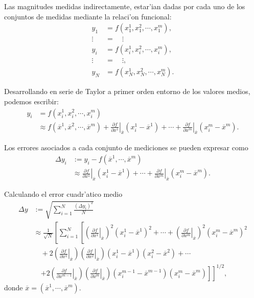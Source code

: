 \documentclass[a4paper]{report}
\begin{document}
Las magnitudes medidas indirectamente, estar'ian dadas por cada uno de los conjuntos de medidas mediante la relaci'on funcional:
\begin{align}
y_1 &= f(x^1_1,x^2_1,\cdots, x^m_1), \\
\vdots &= \quad\vdots  \\
y_i &= f(x^1_i,x^2_i,\cdots, x^m_i),\\
\vdots &= \quad \vdots,  \\
y_N &= f(x^1_N,x^2_N,\cdots, x^m_N).
\end{align}

Desarrollando en serie de Taylor a primer orden entorno de los valores medios, podemos escribir:
\begin{align}
y_i & = f(x^1_i,x^2_i,\cdots, x^m_i)\\
&\approx  f(\overline{x}^1,\overline{x}^2,\cdots, \overline{x}^m)+ \left.\frac{\partial f}{\partial x^1}\right|_{\overline{x}}(x^1_i-\overline{x}^1) + \cdots + \left.\frac{\partial f}{\partial x^m}\right|_{\overline{x}}(x^m_i-\overline{x}^m).
\end{align}

Los errores asociados a cada conjunto de mediciones se pueden expresar como
\begin{align}
\Delta y_i &:= y_i-f(\overline{x}^1,\cdots, \overline{x}^m)\\
&\approx \left.\frac{\partial f}{\partial x^1}\right|_{\overline{x}}(x^1_i-\overline{x}^1) + \cdots + \left.\frac{\partial f}{\partial x^m}\right|_{\overline{x}}(x^m_i-\overline{x}^m).
\end{align}

Calculando el error cuadr'atico medio
\begin{align}
\Delta y &:= \sqrt{\sum_{i=1}^N\frac{(\Delta y_i)^2}{N}} \\
&\approx \frac{1}{\sqrt{N}}\left[\sum_{i=1}^N\left[\left(\left.\frac{\partial f}{\partial x^1}\right|_{\overline{x}}\right)^2 (x^1_i-\overline{x}^1)^2 +\cdots + \left(\left.\frac{\partial f}{\partial x^m}\right|_{\overline{x}}\right)^2(x^m_i-\overline{x}^m)^2 \right.\right. \nonumber \\
& \quad +  2\left(\left.\frac{\partial f}{\partial x^1}\right|_{\overline{x}}\right)\left(\left.\frac{\partial f}{\partial x^2}\right|_{\overline{x}}\right)(x^1_i-\overline{x}^1)(x^2_i-\overline{x}^2)+\cdots \nonumber\\
& \quad \left.\left.  +2\left(\left.\frac{\partial f}{\partial x^{m-1}}\right|_{\overline{x}}\right) \left(\left.\frac{\partial f}{\partial x^m}\right|_{\overline{x}}\right)(x^{m-1}_i-\overline{x}^{m-1})(x^m_i-\overline{x}^m)\right]\right]^{1/2},
\end{align}
donde $\overline{x}=(\overline{x}^1,\cdots, \overline{x}^m)$.
\end{document}
